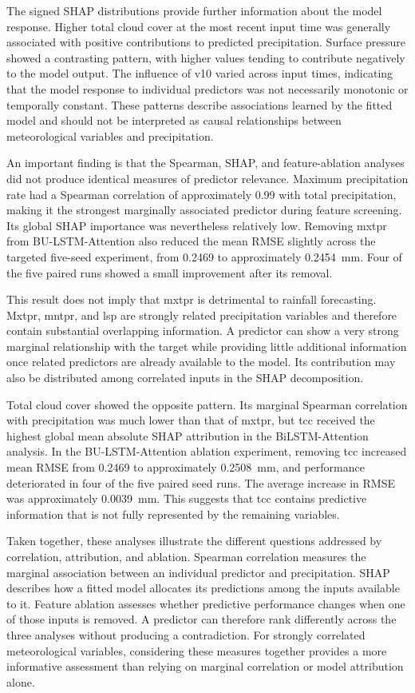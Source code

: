 \documentclass[referee,pdflatex,sn-basic]{sn-jnl}%
\theoremstyle{thmstyleone}%
\theoremstyle{thmstyletwo}%
\theoremstyle{thmstylethree}%
\begin{document}
The signed SHAP distributions provide further information about the model response. Higher total cloud cover at the most recent input time was generally associated with positive contributions to predicted precipitation. Surface pressure showed a contrasting pattern, with higher values tending to contribute negatively to the model output. The influence of v10 varied across input times, indicating that the model response to individual predictors was not necessarily monotonic or temporally constant. These patterns describe associations learned by the fitted model and should not be interpreted as causal relationships between meteorological variables and precipitation.

An important finding is that the Spearman, SHAP, and feature-ablation analyses did not produce identical measures of predictor relevance. Maximum precipitation rate had a Spearman correlation of approximately 0.99 with total precipitation, making it the strongest marginally associated predictor during feature screening. Its global SHAP importance was nevertheless relatively low. Removing mxtpr from BU-LSTM-Attention also reduced the mean RMSE slightly across the targeted five-seed experiment, from 0.2469 to approximately 0.2454~mm. Four of the five paired runs showed a small improvement after its removal.

This result does not imply that mxtpr is detrimental to rainfall forecasting. Mxtpr, mntpr, and lsp are strongly related precipitation variables and therefore contain substantial overlapping information. A predictor can show a very strong marginal relationship with the target while providing little additional information once related predictors are already available to the model. Its contribution may also be distributed among correlated inputs in the SHAP decomposition.

Total cloud cover showed the opposite pattern. Its marginal Spearman correlation with precipitation was much lower than that of mxtpr, but tcc received the highest global mean absolute SHAP attribution in the BiLSTM-Attention analysis. In the BU-LSTM-Attention ablation experiment, removing tcc increased mean RMSE from 0.2469 to approximately 0.2508~mm, and performance deteriorated in four of the five paired seed runs. The average increase in RMSE was approximately 0.0039~mm. This suggests that tcc contains predictive information that is not fully represented by the remaining variables.

Taken together, these analyses illustrate the different questions addressed by correlation, attribution, and ablation. Spearman correlation measures the marginal association between an individual predictor and precipitation. SHAP describes how a fitted model allocates its predictions among the inputs available to it. Feature ablation assesses whether predictive performance changes when one of those inputs is removed. A predictor can therefore rank differently across the three analyses without producing a contradiction. For strongly correlated meteorological variables, considering these measures together provides a more informative assessment than relying on marginal correlation or model attribution alone.
\end{document}
